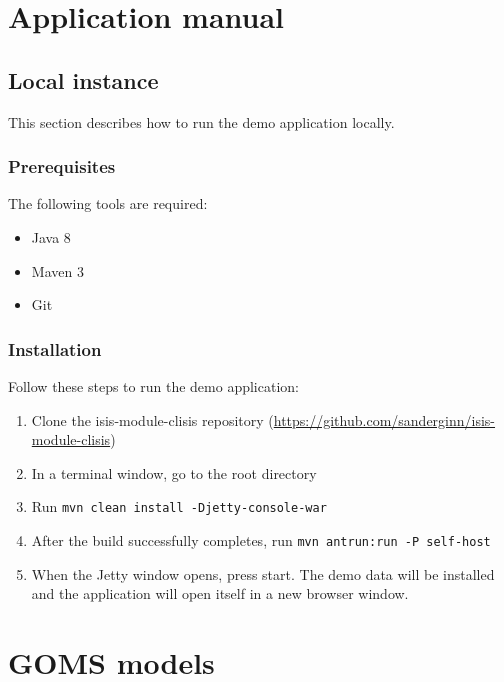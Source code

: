 \appendix
\chapter{Application manual}
\label{appendix:applicationmanual}

\section{Local instance}
\label{section:localinstance}
This section describes how to run the demo application locally.

\subsection{Prerequisites}
The following tools are required:

\begin{itemize}
	\item Java 8
	\item Maven 3
	\item Git
\end{itemize}

\subsection{Installation}
Follow these steps to run the demo application:

\begin{enumerate}
	\item Clone the isis-module-clisis repository (\url{https://github.com/sanderginn/isis-module-clisis})
	\item In a terminal window, go to the root directory
	\item Run \texttt{mvn clean install -Djetty-console-war}
	\item After the build successfully completes, run \texttt{mvn antrun:run -P self-host}
	\item When the Jetty window opens, press start. The demo data will be installed and the application will open itself in a new browser window. 
\end{enumerate}

\chapter{GOMS models}
\label{appendix:gomsmodels}

